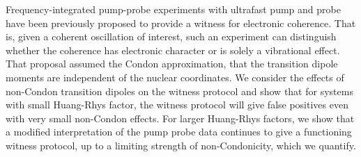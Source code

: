 Frequency-integrated pump-probe experiments with ultrafast pump and probe have been previously proposed to provide a witness for electronic coherence. That is, given a coherent oscillation of interest, such an experiment can distinguish whether the coherence has electronic character or is solely a vibrational effect. That proposal assumed the Condon approximation, that the transition dipole moments are independent of the nuclear coordinates.  
We consider the effects of non-Condon transition dipoles on the witness protocol and show that for systems with small Huang-Rhys factor, the witness protocol will give false positives even with very small non-Condon effects. For larger Huang-Rhys factors, we show that a modified interpretation of the pump probe data continues to give a functioning witness protocol, up to a limiting strength of non-Condonicity, which we quantify.
